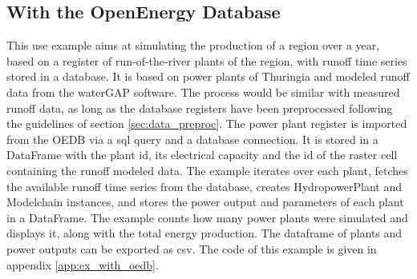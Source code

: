 \subsection{With the OpenEnergy Database}
\label{sub:ex_with_oedb}

This use example aims at simulating the production of a region over a year, based on a register of run-of-the-river plants of the region, with runoff time series stored in a database. It is based on power plants of Thuringia and modeled runoff data from the waterGAP software. The process would be similar with measured runoff data, as long as the database registers have been preprocessed following the guidelines of section \ref{sec:data_preproc}. \newline
The power plant register is imported from the OEDB via a sql query and a database connection. It is stored in a DataFrame with the plant id, its electrical capacity and the id of the raster cell containing the runoff modeled data. The example iterates over each plant, fetches the available runoff time series from the database, creates HydropowerPlant and Modelchain instances, and stores the power output and parameters of each plant in a DataFrame. \newline
The example counts how many power plants were simulated and displays it, along with the total energy production. The dataframe of plants and power outputs can be exported as csv.\newline
The code of this example is given in appendix \ref{app:ex_with_oedb}.
